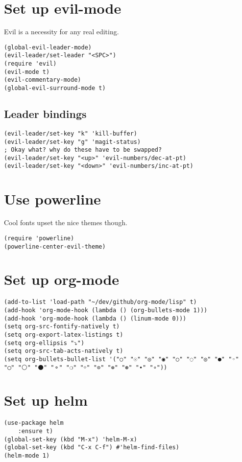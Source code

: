 \documentclass[11pt]{article}
\begin{document}
\section{Set up evil-mode}
\label{sec-8}
Evil is a necessity for any real editing.
\begin{verbatim}
(global-evil-leader-mode)
(evil-leader/set-leader "<SPC>")
(require 'evil)
(evil-mode t)
(evil-commentary-mode)
(global-evil-surround-mode t)
\end{verbatim}
\subsection{Leader bindings}
\label{sec-8-1}
\begin{verbatim}
(evil-leader/set-key "k" 'kill-buffer)
(evil-leader/set-key "g" 'magit-status)
; Okay what? why do these have to be swapped?
(evil-leader/set-key "<up>" 'evil-numbers/dec-at-pt)
(evil-leader/set-key "<down>" 'evil-numbers/inc-at-pt)
\end{verbatim}


\section{Use powerline}
\label{sec-9}
Cool fonts upset the nice themes though.
\begin{verbatim}
(require 'powerline)
(powerline-center-evil-theme)
\end{verbatim}


\section{Set up org-mode}
\label{sec-10}
\begin{verbatim}
(add-to-list 'load-path "~/dev/github/org-mode/lisp" t)
(add-hook 'org-mode-hook (lambda () (org-bullets-mode 1)))
(add-hook 'org-mode-hook (lambda () (linum-mode 0)))
(setq org-src-fontify-natively t)
(setq org-export-latex-listings t)
(setq org-ellipsis "⤵")
(setq org-src-tab-acts-natively t)
(setq org-bullets-bullet-list '("○" "☉" "◎" "◉" "○" "◌" "◎" "●" "◦" "◯" "⚪" "⚫" "⚬" "❍" "￮" "⊙" "⊚" "⊛" "∙" "∘"))
\end{verbatim}


\section{Set up helm}
\label{sec-11}
\begin{verbatim}
(use-package helm
    :ensure t)
(global-set-key (kbd "M-x") 'helm-M-x)
(global-set-key (kbd "C-x C-f") #'helm-find-files)
(helm-mode 1)
\end{verbatim}
\end{document}
